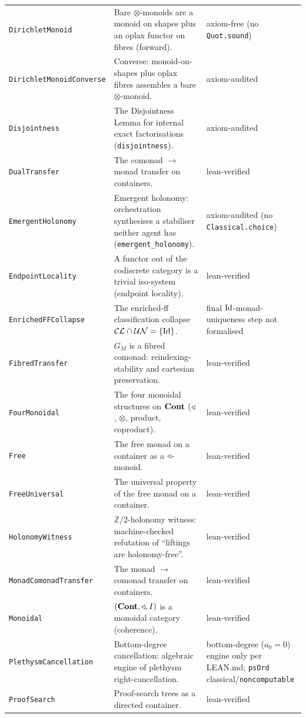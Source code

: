 \begin{longtable}{@{}p{}p{}p{}@{}}
\texttt{DirichletMonoid} & Bare $\otimes$-monoids are a monoid on shapes plus an oplax functor on fibres (forward). & axiom-free (no \texttt{Quot.sound}) \\
\texttt{DirichletMonoidConverse} & Converse: monoid-on-shapes plus oplax fibres assembles a bare $\otimes$-monoid. & axiom-audited \\
\texttt{Disjointness} & The Disjointness Lemma for internal exact factorisations (\texttt{disjointness}). & axiom-audited \\
\texttt{DualTransfer} & The comonad $\to$ monad transfer on containers. & lean-verified \\
\texttt{EmergentHolonomy} & Emergent holonomy: orchestration synthesises a stabiliser neither agent has (\texttt{emergent\_holonomy}). & axiom-audited (no \texttt{Classical.choice}) \\
\texttt{EndpointLocality} & A functor out of the codiscrete category is a trivial iso-system (endpoint locality). & lean-verified \\
\texttt{EnrichedFFCollapse} & The enriched-ff classification collapse $\mathcal{CL}\cap\mathcal{UN}=\{\mathrm{Id}\}$. & final $\mathrm{Id}$-monad-uniqueness step not formalised \\
\texttt{FibredTransfer} & $G_M$ is a fibred comonad: reindexing-stability and cartesian preservation. & lean-verified \\
\texttt{FourMonoidal} & The four monoidal structures on $\mathbf{Cont}$ ($\triangleleft$, $\otimes$, product, coproduct). & lean-verified \\
\texttt{Free} & The free monad on a container as a $\triangleleft$-monoid. & lean-verified \\
\texttt{FreeUniversal} & The universal property of the free monad on a container. & lean-verified \\
\texttt{HolonomyWitness} & $\mathbb{Z}/2$-holonomy witness: machine-checked refutation of ``liftings are holonomy-free''. & lean-verified \\
\texttt{MonadComonadTransfer} & The monad $\to$ comonad transfer on containers. & lean-verified \\
\texttt{Monoidal} & $(\mathbf{Cont},\triangleleft,I)$ is a monoidal category (coherence). & lean-verified \\
\texttt{PlethysmCancellation} & Bottom-degree cancellation: algebraic engine of plethysm right-cancellation. & bottom-degree ($a_0{=}0$) engine only per LEAN.md; \texttt{psOrd} classical/\texttt{noncomputable} \\
\texttt{ProofSearch} & Proof-search trees as a directed container. & lean-verified \\

\end{longtable}
